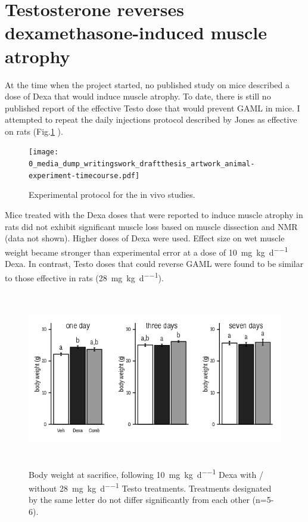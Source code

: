\documentclass[12pt,english]{report}\usepackage[]{graphicx}\usepackage[]{color}
\newenvironment{knitrout}{}{} %
\begin{document}
\section{Testosterone reverses dexamethasone-induced muscle atrophy}

At the time when the project started, no published study on mice described
a dose of Dexa that would induce muscle atrophy. To date, there is
still no published report of the effective Testo dose that would prevent
GAML in mice. I attempted to repeat the daily injections protocol
described by Jones as effective on rats\citep{jones2010effects} (Fig.\ref{fig:In-vivo-experimental-protocol}
).

\begin{figure}
\texttt{[image: 0\_media\_dump\_writingswork\_draftthesis\_artwork\_animal-experiment-timecourse.pdf]}

\protect\caption{Experimental protocol for the in vivo studies.\label{fig:In-vivo-experimental-protocol}}
\end{figure}


Mice treated with the Dexa doses that were reported to induce muscle
atrophy in rats did not exhibit significant muscle loss based on muscle
dissection and NMR (data not shown). Higher doses of Dexa were used.
Effect size on wet muscle weight became stronger than experimental
error at a dose of \SI{10}{\milli\gram\per\kilo\gram\per\day} Dexa.
In contrast, Testo doses that could reverse GAML were found to be
similar to those effective in rats (\SI{28}{\milli\gram\per\kilo\gram\per\day}).

\begin{figure}
\begin{knitrout}
\color{fgcolor}
\includegraphics[width=6in,height=3in]{figure/bodyweightsatsacrifice-1} 

\end{knitrout}

\protect\caption[Body weight at sacrifice, following Dexa with / without Testo treatments.]{Body weight at sacrifice, following \SI{10}{\milli\gram\per\kilo\gram\per\day}
Dexa with / without \SI{28}{\milli\gram\per\kilo\gram\per\day} Testo
treatments. Treatments designated by the same letter do not differ
significantly from each other (n=5-6).\label{fig:Body-weight-at-sacrifice}}
\end{figure}
\end{document}
